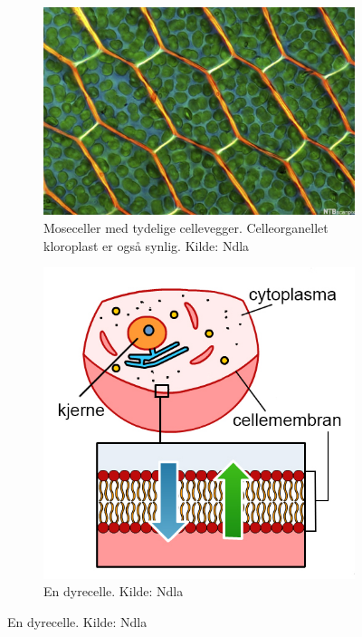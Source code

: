 \documentclass[main.tex]{subfiles}
\begin{document}
\begin{figure}[h!]
\centering
    \begin{subfigure}{.5\textwidth}
    \centering
    \includegraphics[scale = 0.5]{../figures/cellevegg.jpg}
    \caption{Moseceller med tydelige cellevegger. Celleorganellet kloroplast er også synlig. Kilde: Ndla}
    \end{subfigure}%
    \begin{subfigure}{.5\textwidth}
    \centering
    \includegraphics[scale = 0.25]{../figures/cellemembran.jpg}
    \caption{En dyrecelle. Kilde: Ndla}

\end{subfigure}
\end{figure}
\end{document}
